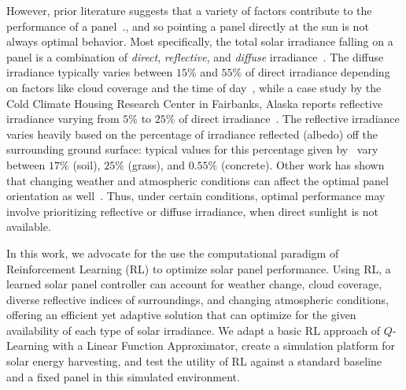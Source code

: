 \documentclass[11pt]{article}
\begin{document}
However, prior literature suggests that a variety of factors contribute to the performance of a panel~\cite{King2001}., and so pointing a panel directly at the sun is not always optimal behavior. Most specifically, the total solar irradiance falling on a panel is a combination of {\it direct}, {\it reflective}, and {\it diffuse} irradiance~\cite{Benghanem2011}. The diffuse irradiance typically varies between $15\%$ and $55\%$ of direct irradiance depending on factors like cloud coverage and the time of day~\cite{peterson1981ratio}, while a case study by the Cold Climate Housing Research Center in Fairbanks, Alaska reports reflective irradiance varying from $5\%$ to $25\%$ of direct irradiance~\cite{colgan2010}. The reflective irradiance varies heavily based on the percentage of irradiance reflected (albedo) off the surrounding ground surface: typical values for this percentage given by~\citet{mcevoy2003practical} vary between $17\%$ (soil), $25\%$ (grass), and $0.55\%$ (concrete). Other work has shown that changing weather and atmospheric conditions can affect the optimal panel orientation as well~\cite{Kelly2009}. Thus, under certain conditions, optimal performance may involve prioritizing reflective or diffuse irradiance, when direct sunlight is not available.

In this work, we advocate for the use the computational paradigm of Reinforcement Learning (RL) to optimize solar panel performance. Using RL, a learned solar panel controller can account for weather change, cloud coverage, diverse reflective indices of surroundings, and changing atmospheric conditions, offering an efficient yet adaptive solution that can optimize for the given availability of each type of solar irradiance. We adapt a basic RL approach of $Q$-Learning with a Linear Function Approximator, create a simulation platform for solar energy harvesting, and test the utility of RL against a standard baseline and a fixed panel in this simulated environment.


\end{document}
